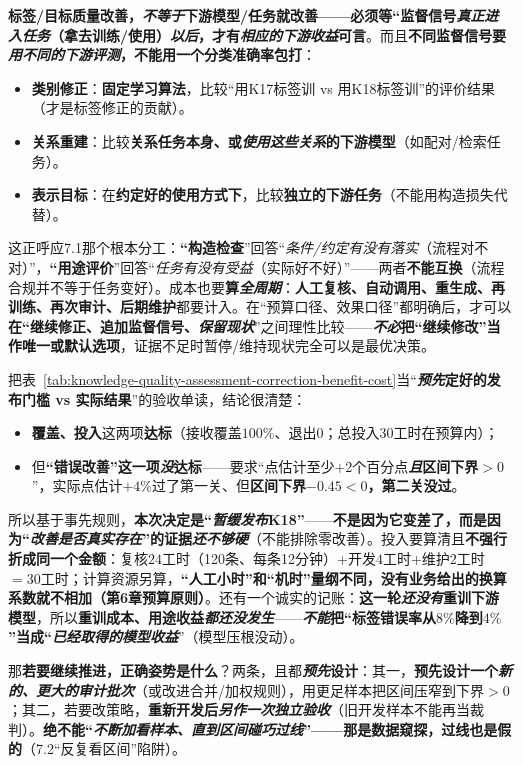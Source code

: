 \textbf{标签/目标质量改善，\emph{不等于}下游模型/任务就改善——必须等“监督信号\emph{真正进入任务}（拿去训练/使用）\emph{以后}，才有\emph{相应的下游收益}可言}。而且\textbf{不同监督信号要\emph{用不同的下游评测}，不能用一个分类准确率包打}：
\begin{itemize}\item \textbf{类别修正}：\textbf{固定学习算法}，比较“用K17标签训 vs 用K18标签训”的评价结果（才是标签修正的贡献）。\item \textbf{关系重建}：比较\textbf{关系任务本身、或\emph{使用这些关系}的下游模型}（如配对/检索任务）。\item \textbf{表示目标}：在\textbf{约定好的使用方式下}，比较\textbf{独立的下游任务}（不能用构造损失代替）。\end{itemize}
这正呼应7.1那个根本分工：\textbf{“构造检查}”回答“\emph{条件/约定有没有\emph{落实}}（流程对不对）”，\textbf{“用途评价}”回答“\emph{任务有没有\emph{受益}}（实际好不好）”——两者\textbf{不能互换}（流程合规并不等于任务变好）。成本也要\textbf{算\emph{全周期}}：\textbf{人工复核、自动调用、重生成、再训练、再次审计、后期维护}都要计入。在“预算口径、效果口径”都明确后，才可以\textbf{在“继续修正、追加监督信号、\emph{保留现状}}”之间理性比较——\textbf{\emph{不必}把“继续修改”当作唯一或默认选项}，证据不足时暂停/维持现状完全可以是最优决策。

把表~\ref{tab:knowledge-quality-assessment-correction-benefit-cost}当“\textbf{\emph{预先}定好的发布门槛 vs 实际结果}”的验收单读，结论很清楚：
\begin{itemize}\item \textbf{覆盖、投入}这两项\textbf{达标}（接收覆盖$100\%$、退出0；总投入30工时在预算内）；\item 但\textbf{“错误改善”这一项\emph{没}达标}——要求“点估计至少+2个百分点\textbf{\emph{且}区间下界$>0$}”，实际点估计$+4\%$过了第一关、但\textbf{区间下界$-0.45<0$，第二关没过}。\end{itemize}
所以基于事先规则，\textbf{本次决定是“\emph{暂缓发布}K18”}——\textbf{不是因为它变差了，而是因为“\emph{改善\emph{是否真实存在}}”的证据\emph{还不够硬}}（不能排除零改善）。投入要算清且\textbf{不强行折成同一个金额}：复核$24$工时（120条、每条12分钟）+开发$4$工时+维护$2$工时$=30$工时；计算资源另算，\textbf{“人工小时”和“机时”量纲不同，没有业务给出的换算系数就不相加（第6章预算原则）}。还有一个诚实的记账：\textbf{这一轮\emph{还没有}重训下游模型}，所以\textbf{重训成本、用途收益\emph{都还没发生}}——\textbf{\emph{不能}把“标签错误率从$8\%$降到$4\%$”当成“\emph{已经取得的模型收益}}”（模型压根没动）。

那\textbf{若要继续推进，正确姿势是什么}？两条，且都\textbf{\emph{预先}设计}：其一，\textbf{预先设计一个\emph{新的、更大的审计批次}}（或改进合并/加权规则），用更足样本把区间压窄到下界$>0$；其二，若要改策略，\textbf{重新开发后\emph{另作一次独立验收}}（旧开发样本不能再当裁判）。\textbf{绝不能“\emph{不断加看样本、直到区间\emph{碰巧}过线}”——那是数据窥探，过线也是假的}（7.2“反复看区间”陷阱）。

